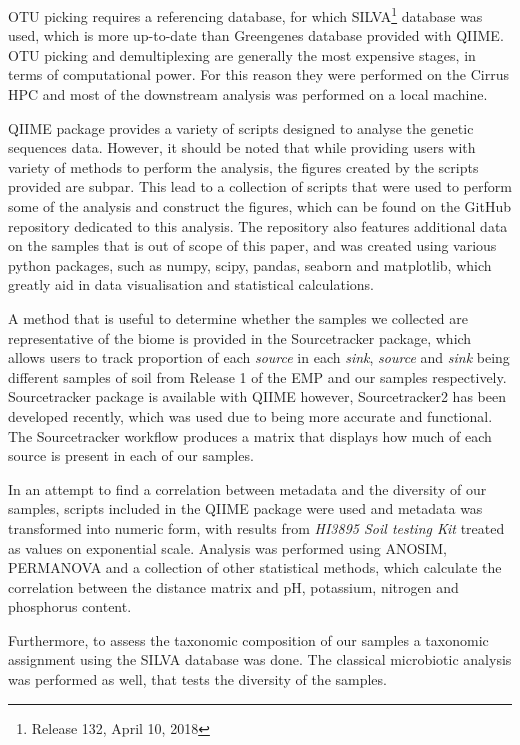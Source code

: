\documentclass[12pt,twocolumn]{article} %
\begin{document}
\par 
OTU picking requires a referencing database, for which SILVA\footnote{Release 132, April 10, 2018}\cite{Quast2012} database was used, which is more up-to-date than Greengenes\cite{McDonald2012} database provided with QIIME. OTU picking and demultiplexing are generally the most expensive stages, in terms of computational power. For this reason they were performed on the Cirrus HPC and most of the downstream analysis was performed on a local machine. 
\par
QIIME package provides a variety of scripts designed to analyse the genetic sequences data. However, it should be noted that while providing users with variety of methods to perform the analysis, the figures created by the scripts provided are subpar. This lead to a collection of scripts that were used to perform some of the analysis and construct the figures, which can be found on the GitHub repository dedicated to this analysis\cite{Anonymous2018}. The repository also features additional data on the samples that is out of scope of this paper, and was created using various python packages, such as numpy, scipy, pandas, seaborn and matplotlib, which greatly aid in data visualisation and statistical calculations.
\par
A method that is useful to determine whether the samples we collected are representative of the biome is provided in the Sourcetracker package\cite{Knights2011}, which allows users to track proportion of each \textit{source} in each \textit{sink}, \textit{source} and \textit{sink} being different samples of soil from Release 1 of the EMP and our samples respectively. Sourcetracker package is available with QIIME however, Sourcetracker2 has been developed recently, which was used due to being more accurate and functional. 
The Sourcetracker workflow produces a matrix that displays how much of each source is present in each of our samples.
\par
In an attempt to find a correlation between metadata and the diversity of our samples, scripts included in the QIIME package were used and metadata was transformed into numeric form, with results from \textit{HI3895 Soil testing Kit} treated as values on exponential scale. Analysis was performed using ANOSIM\cite{CLARKE1993}, PERMANOVA\cite{Tang2016} and a collection of other statistical methods, which calculate the correlation between the distance matrix and pH, potassium, nitrogen and phosphorus content.
\par
Furthermore, to assess the taxonomic composition of our samples a taxonomic assignment using the SILVA\cite{Quast2012} database was done. The classical microbiotic analysis was performed as well, that tests the diversity of the samples.
%
%
\end{document}
